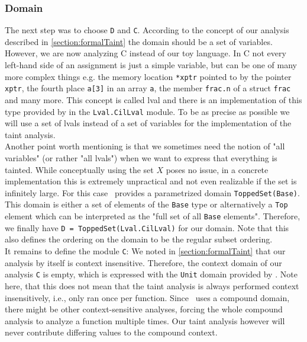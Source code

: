     \subsubsection{Domain}
      The next step was to choose \texttt{D} and \texttt{C}. According to the concept of our analysis described in \autoref{section:formalTaint} the domain should be a set of variables. However, we are now analyzing C instead of our toy language. In C not every left-hand side of an assignment is just a simple variable, but can be one of many more complex things e.g. the memory location \texttt{*xptr} pointed to by the pointer \texttt{xptr}, the fourth place \texttt{a[3]} in an array \texttt{a}, the member \texttt{frac.n} of a struct \texttt{frac} and many more. This concept is called \ac{lval} and there is an implementation of this type provided by \gob in the \texttt{Lval.CilLval} module. To be as precise as possible we will use a set of \ac{lval}s instead of a set of variables for the implementation of the taint analysis.\\
      Another point worth mentioning is that we sometimes need the notion of "all variables" (or rather "all \ac{lval}s") when we want to express that everything is tainted. While conceptually using the set $X$ poses no issue, in a concrete implementation this is extremely unpractical and not even realizable if the set is infinitely large. For this case \gob\ provides a parametrized domain \texttt{ToppedSet(Base)}. This domain is either a set of elements of the \texttt{Base} type or alternatively a \texttt{Top} element which can be interpreted as the "full set of all \texttt{Base} elements". Therefore, we finally have \texttt{D = ToppedSet(Lval.CilLval)} for our domain. Note that this also defines the ordering on the domain to be the regular subset ordering.\\
      It remains to define the module \texttt{C}: We noted in \autoref{section:formalTaint} that our analysis by itself is context insensitive. Therefore, the context domain of our analysis \texttt{C} is empty, which is expressed with the \texttt{Unit} domain provided by \gob. Note here, that this does not mean that the taint analysis is always performed context insensitively, i.e., only ran once per function. Since \gob\ uses a compound domain, there might be other context-sensitive analyses, forcing the whole compound analysis to analyze a function multiple times. Our taint analysis however will never contribute differing values to the compound context.

